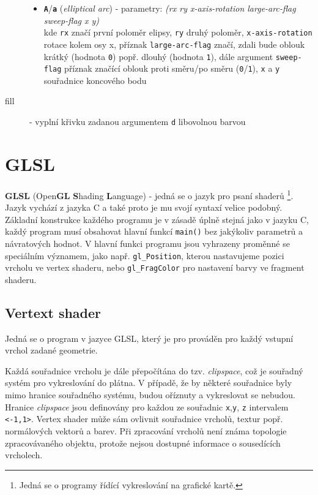 \begin{description}
\begin{itemize}
		\item \texttt{\textbf{A}}/\texttt{\textbf{a}} (\textit{elliptical arc}) - parametry:  \textit{{\small (rx ry x-axis-rotation large-arc-flag sweep-flag x y)}} \\ kde \texttt{rx} značí první poloměr elipsy, \texttt{ry} druhý poloměr, \texttt{x-axis-rotation} rotace kolem osy x, příznak \texttt{large-arc-flag} značí, zdali bude oblouk krátký (hodnota \texttt{0}) popř. dlouhý (hodnota \texttt{1}), dále argument \texttt{sweep-flag} příznak značící oblouk proti směru/po směru (\texttt{0}/\texttt{1}), \texttt{x} a \texttt{y} souřadnice koncového bodu
	\end{itemize}


	\item[fill]  - vyplní křivku zadanou argumentem \texttt{d} libovolnou barvou
\end{description}




\newpage

\section{GLSL}
\textbf{GLSL} (Open\textbf{GL} \textbf{S}hading \textbf{L}anguage) - jedná se o jazyk pro psaní shaderů \footnote{Jedná se o programy řídící vykreslování na grafické kartě.}. Jazyk vychází z jazyka C a také proto je mu svojí syntaxí velice podobný. Základní konstrukce každého programu je v zásadě úplně stejná jako v jazyku C, každý program musí obsahovat hlavní funkcí \texttt{main()} bez jakýkoliv parametrů a návratových hodnot. V hlavní funkci programu jsou vyhrazeny proměnné se speciálním významem, jako např. \texttt{gl\_Position}, kterou nastavujeme  pozici vrcholu ve vertex shaderu, nebo \texttt{gl\_FragColor} pro nastavení barvy ve fragment shaderu.

\subsection{Vertext shader}
Jedná se o program v jazyce GLSL, který je pro prováděn pro každý vstupní vrchol zadané geometrie. 

Každá souřadnice vrcholu je dále přepočítána do tzv. \textit{clipspace}, což je souřadný systém pro vykreslování do plátna. V případě, že by některé souřadnice byly mimo hranice souřadného systému, budou oříznuty a vykreslovat se nebudou. Hranice \textit{clipspace} jsou definovány pro každou ze souřadnic \texttt{x},\texttt{y}, \texttt{z} intervalem \texttt{<-1,1>}. Vertex shader může sám ovlivnit souřadnice vrcholů, textur popř. normálových vektorů a barev. Při zpracování vrcholů není známa topologie zpracovávaného objektu, protože nejsou dostupné informace o sousedících vrcholech. 


